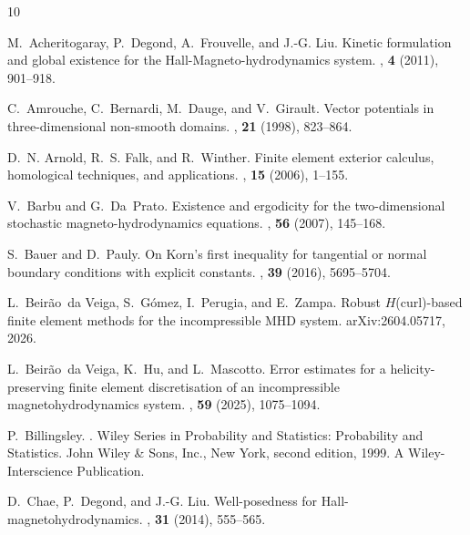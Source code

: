 \documentclass[11pt, reqno]{amsart}
\theoremstyle{definition}
\numberwithin{equation}{section}
\begin{document}

%
%

\begin{thebibliography}{10}
	
	M.~Acheritogaray, P.~Degond, A.~Frouvelle, and J.-G. Liu.
	\newblock Kinetic formulation and global existence for the
	{H}all-{M}agneto-hydrodynamics system.
	,  {\bf 4} (2011), 901--918.
	
	C.~Amrouche, C.~Bernardi, M.~Dauge, and V.~Girault.
	\newblock Vector potentials in three-dimensional non-smooth domains.
	,  {\bf 21} (1998), 823--864.
	
	D.~N. Arnold, R.~S. Falk, and R.~Winther.
	\newblock Finite element exterior calculus, homological techniques, and
	applications.
	,  {\bf 15} (2006), 1--155.
	
	V.~Barbu and G.~Da~Prato.
	\newblock Existence and ergodicity for the two-dimensional stochastic
	magneto-hydrodynamics equations.
	,  {\bf 56} (2007), 145--168.
	
	S.~Bauer and D.~Pauly.
	\newblock On {K}orn's first inequality for tangential or normal boundary
	conditions with explicit constants.
	,  {\bf 39} (2016), 5695--5704.
	
	L.~Beir\~ao~da Veiga, S.~G\'omez, I.~Perugia, and E.~Zampa.
	\newblock Robust ${H}$(curl)-based finite element methods for the
	incompressible {MHD} system.
	\newblock arXiv:2604.05717, 2026.
	
	L.~Beir\~ao~da Veiga, K.~Hu, and L.~Mascotto.
	\newblock Error estimates for a helicity-preserving finite element
	discretisation of an incompressible magnetohydrodynamics system.
	,  {\bf 59} (2025), 1075--1094.
	
	P.~Billingsley.
	.
	\newblock Wiley Series in Probability and Statistics: Probability and
	Statistics. John Wiley \& Sons, Inc., New York, second edition, 1999.
	\newblock A Wiley-Interscience Publication.
	
	D.~Chae, P.~Degond, and J.-G. Liu.
	\newblock Well-posedness for {H}all-magnetohydrodynamics.
	,  {\bf 31}
	(2014), 555--565.
	

\end{thebibliography}
\end{document}
